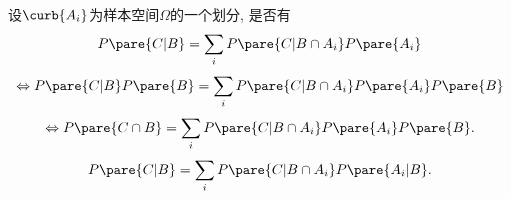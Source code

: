 \documentclass{ctexart}
\begin{document}
设$\curb{A_i}$为样本空间$\Omega$的一个划分, 是否有
\[ P\pare{C\vert B} = \sum_i P\pare{C\vert B\cap A_i}P\pare{A_i} \]
\[ \Leftrightarrow P\pare{C\vert B}P\pare{B} = \sum_i P\pare{C\vert B\cap A_i}P\pare{A_i}P\pare{B} \]
\[ \Leftrightarrow P\pare{C\cap B} = \sum_i P\pare{C\vert B\cap A_i}P\pare{A_i}P\pare{B}. \]
\[ P\pare{C\vert B} = \sum_i P\pare{C\vert B\cap A_i}P\pare{A_i\vert B}. \]
\end{document}
